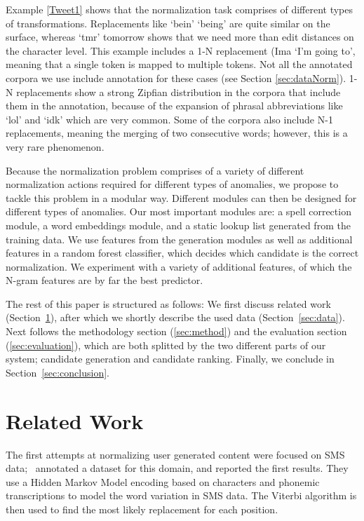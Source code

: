 \documentclass[a4paper,10pt,twoside]{article}
\begin{document}
Example \ref{Tweet1} shows that the normalization task comprises of
different types of transformations. Replacements like `bein'  `being' 
are quite similar on the surface, whereas `tmr'  tomorrow shows that
we need more than edit distances on the character level. This example 
includes a 1-N replacement (Ima  `I'm going to', meaning that a single
token is mapped to multiple tokens. Not all the annotated corpora we use
include annotation for these cases (see Section \ref{sec:dataNorm}).
1-N replacements show a strong Zipfian distribution in the corpora that include
them in the annotation, because of the expansion of phrasal abbreviations like
`lol' and `idk' which are very common. Some of the corpora also include N-1
replacements, meaning the merging of two consecutive words; however, this is a
very rare phenomenon.

Because the normalization problem comprises of a variety of different
normalization actions required for different types of anomalies, we propose
to tackle this problem in a modular way.  Different modules can then be
designed for different types of anomalies.  Our most important modules are:
a spell correction module, a word embeddings module, and a static lookup list
generated from the training data.  We use features from the generation modules
as well as additional features in a random forest classifier, which decides
which candidate is the correct normalization. We experiment with a variety of
additional features, of which the N-gram features are by far the best
predictor.

The rest of this paper is structured as follows: We first discuss related work
(Section~\ref{sec:related}), after which we shortly describe the used data
(Section~\ref{sec:data}).  Next follows the methodology section
(\ref{sec:method}) and the evaluation section (\ref{sec:evaluation}), which are
both splitted by the two different parts of our system; candidate generation
and candidate ranking.  Finally, we conclude in Section~\ref{sec:conclusion}.

 
\section{Related Work}
\label{sec:related}
The first attempts at normalizing user generated content were focused on SMS
data;~ annotated a dataset for this
domain, and reported the first results. They use a Hidden Markov Model
encoding based on characters and phonemic transcriptions to model the word
variation in SMS data.  The Viterbi algorithm is then used to find the most
likely replacement for each position.
\end{document}
